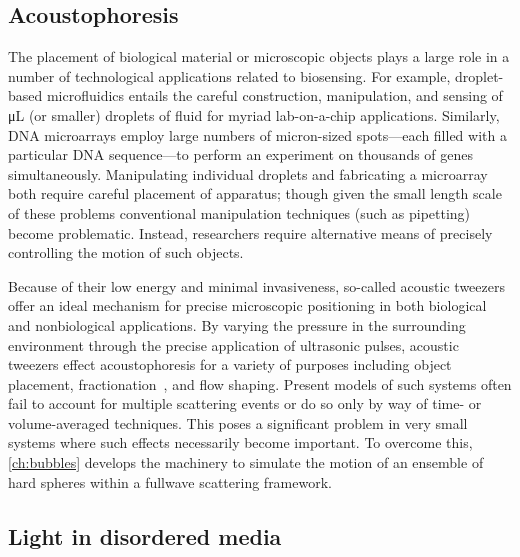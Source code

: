 \subsection{Acoustophoresis}

The placement of biological material or microscopic objects plays a large role in a number of technological applications related to biosensing.
For example, droplet-based microfluidics entails the careful construction, manipulation, and sensing of \si{\micro\liter} (or smaller) droplets of fluid for myriad lab-on-a-chip applications.
Similarly, DNA microarrays employ large numbers of micron-sized spots---each filled with a particular DNA sequence---to perform an experiment on thousands of genes simultaneously.
Manipulating individual droplets and fabricating a microarray both require careful placement of apparatus; though given the small length scale of these problems conventional manipulation techniques (such as pipetting) become problematic.
Instead, researchers require alternative means of precisely controlling the motion of such objects.

Because of their low energy and minimal invasiveness, so-called acoustic tweezers offer an ideal mechanism for precise microscopic positioning in both biological and nonbiological applications.
By varying the pressure in the surrounding environment through the precise application of ultrasonic pulses, acoustic tweezers effect acoustophoresis for a variety of purposes including object placement, fractionation~\cite{Petersson2007}, and flow shaping.
Present models of such systems often fail to account for multiple scattering events or do so only by way of time- or volume-averaged techniques.
This poses a significant problem in very small systems where such effects necessarily become important.
To overcome this, \cref{ch:bubbles} develops the machinery to simulate the motion of an ensemble of hard spheres within a fullwave scattering framework.

\subsection{Light in disordered media}

